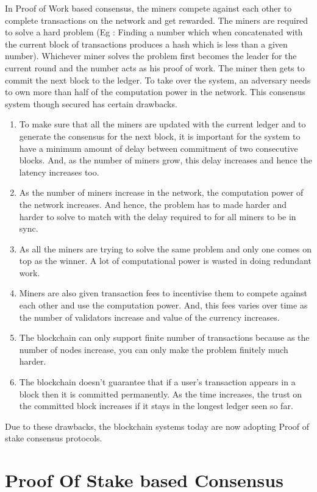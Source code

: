 In Proof of Work based consensus, the miners compete against each other to complete transactions on the network and get rewarded. The miners are required to solve a hard problem (Eg : Finding a number which when concatenated with the current block of transactions produces a hash which is less than a given number). Whichever miner solves the problem first becomes the leader for the current round and the number acts as his proof of work. The miner then gets to commit the next block to the ledger. To take over the system, an adversary needs to own more than half of the computation power in the network. This consensus system though secured has certain drawbacks. 
\begin{enumerate}
  \item To make sure that all the miners are updated with the current ledger and to generate the consensus for the next block, it is important for the system to have a minimum amount of delay between commitment of two consecutive blocks. And, as the number of miners grow, this delay increases and hence the latency increases too.
  \item As the number of miners increase in the network, the computation power of the network increases. And hence, the problem has to made harder and harder to solve to match with the delay required to for all miners to be in sync.
  \item As all the miners are trying to solve the same problem and only one comes on top as the winner. A lot of computational power is wasted in doing redundant work.
  \item Miners are also given transaction fees to incentivise them to compete against each other and use the computation power. And, this fees varies over time as the number of validators increase and value of the currency increases.
  \item The blockchain can only support finite number of transactions because as the number of nodes increase, you can only make the problem finitely much harder.
  \item The blockchain doesn't guarantee that if a user's transaction appears in a block then it is committed permanently. As the time increases, the trust on the committed block increases if it stays in the longest ledger seen so far.
\end{enumerate}

Due to these drawbacks, the blockchain systems today are now adopting Proof of stake consensus protocols.

\section{Proof Of Stake based Consensus}

